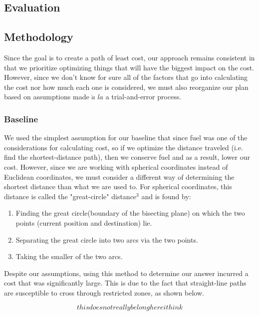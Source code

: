 \documentclass{article}[12pt]
\begin{document}
\begin{multicols}{2}
\section{Evaluation}
\subsection{Methodology}
Since the goal is to create a path of least cost, our approach remains consistent in that we prioritize optimizing things that will have the biggest impact on the cost. However, since we don't know for sure all of the factors that go into calculating the cost nor how much each one is considered, we must also reorganize our plan based on assumptions made $\grave{a}$ $la$ a trial-and-error process.

\subsubsection{Baseline}

We used the simplest assumption for our baseline that since fuel was one of the considerations for calculating cost, so if we optimize the distance traveled (i.e. find the shortest-distance path), then we conserve fuel and as a result, lower our cost. However, since we are working with spherical coordinates instead of Euclidean coordinates, we must consider a different way of determining the shortest distance than what we are used to. For spherical coordinates, this distance is called the "great-circle" distance$^3$ and is found by:\\

	\begin{enumerate}
		\item Finding the great circle(boundary of the bisecting plane) on which the two points (current position and destination) lie.
		\item Separating the great circle into two arcs via the two points. 
		\item Taking the smaller of the two arcs.\\
	\end{enumerate}

Despite our assumptions, using this method to determine our answer incurred a cost that was significantly large. This is due to the fact that straight-line paths are susceptible to cross through restricted zones, as shown below.

$$this does not really belong here i think$$


\end{multicols}
\end{document}

